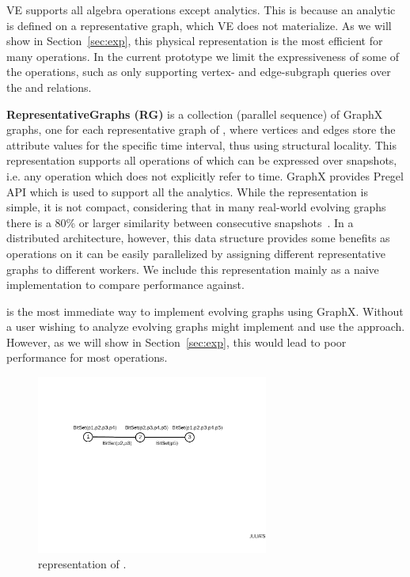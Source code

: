 VE supports all \tg algebra operations except analytics.  This is
because an analytic is defined on a representative graph, which VE
does not materialize.  As we will show in Section~\ref{sec:exp}, this
physical representation is the most efficient for many operations.  In
the current prototype we limit the expressiveness of some of the
operations, such as only supporting vertex- and edge-subgraph queries
over the \tav and \tae relations.

{\bf RepresentativeGraphs (RG)} is a collection (parallel sequence) of
GraphX graphs, one for each representative graph of \ttt, where
vertices and edges store the attribute values for the specific time
interval, thus using structural locality.  This representation
supports all operations of \tga which can be expressed over snapshots,
i.e. any operation which does not explicitly refer to time.  GraphX
provides Pregel API which is used to support all the analytics.
%
While the \rg representation is simple, it is not compact, considering
that in many real-world evolving graphs there is a 80\% or larger
similarity between consecutive snapshots~\cite{Miao2015}.  In a
distributed architecture, however, this data structure provides some
benefits as operations on it can be easily parallelized by assigning
different representative graphs to different workers.  We include this
representation mainly as a naive implementation to compare performance
against.

\rg is the most immediate way to implement evolving graphs using
GraphX. Without \ql a user wishing to analyze evolving graphs might
implement and use the \rg approach.  However, as we will show in
Section~\ref{sec:exp}, this would lead to poor performance for most
operations.

\begin{figure}[t!]
\centering
\includegraphics[width=3in]{figs/ogc.pdf}
\vspace{-0.2cm}
\caption{\og representation of .}
\vspace{-0.1cm}
\label{fig:ogc}
\end{figure}

